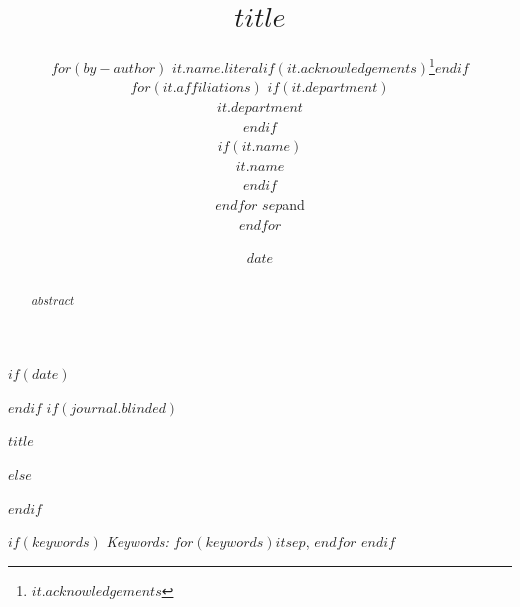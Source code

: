 

\def\spacingset#1{\renewcommand{\baselinestretch}%
{#1}\small\normalsize} \spacingset{1}



$if(date)$
\date{$date$}
$endif$
$if(journal.blinded)$
\spacingset{.8}
\bigskip
\bigskip
\bigskip
\begin{center}
  {\LARGE\bf $title$}
\end{center}
\smallskip
\bigskip
\spacingset{1}
$else$
\title{\bf $title$}
\author{
$for(by-author)$
$it.name.literal$$if(it.acknowledgements)$\thanks{$it.acknowledgements$}$endif$\\
$for(it.affiliations)$
$if(it.department)$\parbox[t]{0.9\textwidth}{\centering $it.department$}$endif$\\
$if(it.name)$\parbox[t]{0.9\textwidth}{\centering $it.name$}$endif$\\[0.5em]
$endfor$
$sep$and\\[0.5em]
$endfor$
}
\maketitle
$endif$

\bigskip
\bigskip
\begin{abstract}
$abstract$
\end{abstract}

$if(keywords)$
\noindent%
{\it Keywords:} $for(keywords)$$it$$sep$, $endfor$
\vfill
$endif$

\newpage
\spacingset{1.9} %

